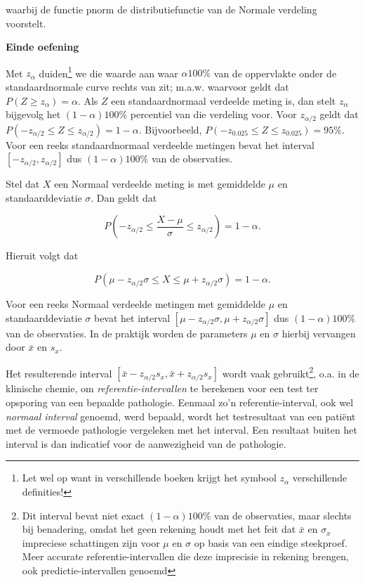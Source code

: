 \documentclass[
  12pt,dutch,coursenotes]{book}
\begin{document}
waarbij de functie pnorm de distributiefunctie van de Normale verdeling voorstelt.

\textbf{Einde oefening}

Met \(z_{\alpha}\) duiden\footnote{Let wel op want in verschillende boeken krijgt het symbool \(z_{\alpha}\) verschillende definities!} we die waarde aan waar \(\alpha100\%\) van de
oppervlakte onder de standaardnormale curve rechts van zit; m.a.w. waarvoor
geldt dat \(P(Z \geq z_{\alpha}) = \alpha\). Als \(Z\) een standaardnormaal
verdeelde meting is, dan stelt \(z_{\alpha}\) bijgevolg het \((1-\alpha)100\%\)
percentiel van die verdeling voor. Voor \(z_{\alpha/2}\) geldt dat \(P(-z_{\alpha/2}\leq Z \leq z_{\alpha/2}) = 1-\alpha\). Bijvoorbeeld, \(P( - z_{0.025}\leq Z \leq z_{0.025}) = 95\%\). Voor een reeks standaardnormaal
verdeelde metingen bevat het interval \([-z_{\alpha/2},z_{\alpha/2}]\) dus \((1-\alpha)100\%\) van de observaties.

Stel dat \(X\) een Normaal verdeelde meting is met gemiddelde \(\mu\) en
standaarddeviatie \(\sigma\). Dan geldt dat

\begin{equation*}
P\left( - z_{\alpha/2}\leq \frac{X - \mu}{\sigma} \leq z_{\alpha/2}\right) =
1-\alpha .
\end{equation*}

Hieruit volgt dat

\begin{equation*}
P( \mu - z_{\alpha/2} \sigma \leq X \leq \mu + z_{\alpha/2} \sigma ) =
1-\alpha .
\end{equation*}

Voor een reeks Normaal verdeelde metingen met gemiddelde \(\mu\) en
standaarddeviatie \(\sigma\) bevat het interval \([\mu-z_{\alpha/2}\sigma,\mu+z_{\alpha/2}\sigma]\) dus \((1-\alpha)100\%\) van de observaties. In de
praktijk worden de parameters \(\mu\) en \(\sigma\) hierbij vervangen door \(\bar x\) en \(s_x\).

Het resulterende interval \([\bar x-z_{\alpha/2}s_x,\bar x+z_{\alpha/2}s_x]\)
wordt vaak gebruikt\footnote{Dit interval bevat niet exact \((1-\alpha)100\%\) van de observaties, maar slechts bij benadering, omdat het geen rekening houdt met het feit dat \(\bar x\) en \(\sigma_x\) impreciese schattingen zijn voor \(\mu\) en \(\sigma\) op basis van een eindige steekproef. Meer accurate referentie-intervallen die deze imprecisie in rekening brengen, ook predictie-intervallen genoemd}, o.a. in de klinische chemie, om \emph{referentie-intervallen} te berekenen voor een test ter opsporing van een
bepaalde pathologie. Eenmaal zo'n referentie-interval, ook wel \emph{normaal interval} genoemd, werd bepaald, wordt het testresultaat van een
patiënt met de vermoede pathologie vergeleken met het interval. Een
resultaat buiten het interval is dan indicatief voor de aanwezigheid van de
pathologie.
\end{document}
